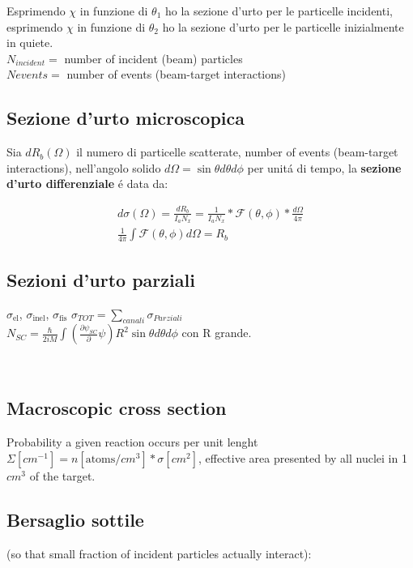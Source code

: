 \documentclass[main.tex]{subfiles}
\begin{document}
Esprimendo $\chi$ in funzione di $\theta_1$ ho la sezione d'urto per le particelle incidenti, esprimendo $\chi$ in funzione di $\theta_2$ ho la sezione d'urto per le particelle inizialmente in quiete.\\

$N_{incident}=$ number of incident (beam) particles\\
$N{events}=$ number of events (beam-target interactions)\\

\subsection{Sezione d'urto microscopica}

 Sia $dR_b(\Omega)$ il numero di particelle scatterate,  number of events (beam-target interactions), nell'angolo solido $d\Omega=\sin{\theta} d\theta d\phi$ per unit\'a di tempo,
la \textbf{sezione d'urto differenziale} \'e data da:

\begin{align*}
d\sigma(\Omega)=\frac{dR_b}{I_aN_x}=\frac{1}{I_aN_x}*\mathcal{F}(\theta,\phi)*\frac{d\Omega}{4\pi}\\
\frac{1}{4\pi}\int\mathcal{F}(\theta,\phi)d\Omega=R_b
\end{align*} 

\subsection{Sezioni d'urto parziali}

$\sigma_{\text{el}}$, $\sigma_{\text{inel}}$, $\sigma_{\text{fis}}$ $\sigma_{TOT}=\sum_{canali}\sigma_{Parziali}$\\
$N_{SC}=\frac{\hbar}{2iM}\int(\frac{\partial \psi_{SC}}{\partial }\psi)R^2\sin{\theta}d\theta d\phi$ con R grande.

\\

\subsection{Macroscopic cross section}
Probability a given reaction occurs per unit lenght
$\Sigma[cm^{-1}]=n[\text{atoms}/cm^3]*\sigma[cm^2]$,
effective area presented by all nuclei in 1 $cm^3$ of the target.

\subsection{Bersaglio sottile} (so that small fraction of incident particles actually interact): 
\end{document}

